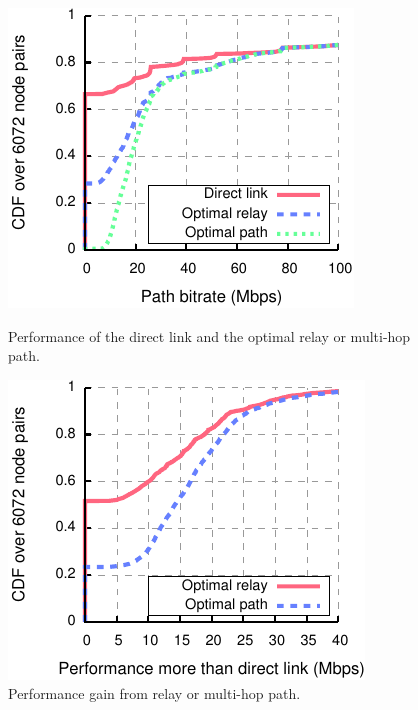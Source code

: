 \begin{figure}[t]
\begin{minipage}{0.48\textwidth}
	\centering
	\includegraphics[width=\textwidth]{figures/applications/relay_gains.pdf}
	\caption[Performance of the direct link and the multihop paths]{\label{fig:relay_sel_gains}Performance of the direct link and the optimal relay or multi-hop path.}
\end{minipage}
\hfill
\begin{minipage}{0.48\textwidth}
	\centering
	\includegraphics[width=\textwidth]{figures/applications/relay_gains_mbps.pdf}
	\caption[Performance gain from multihop paths]{\label{fig:relay_sel_gains_mbps}Performance gain from relay or multi-hop path.}
\end{minipage}
\end{figure}

